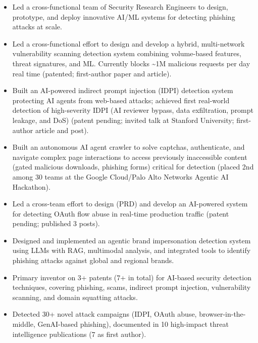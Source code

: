 \documentclass[letterpaper,11pt]{article}
\begin{document}
      \begin{itemize}[leftmargin=0.2in, label={$\bullet$}, topsep=0pt]
        \item \small Led a cross-functional team of Security Research Engineers to design, prototype, and deploy innovative AI/ML systems for detecting phishing attacks at scale.
        \item \small Led a cross-functional effort to design and develop a hybrid, multi-network vulnerability scanning detection system combining volume-based features, threat signatures, and ML. Currently blocks \textasciitilde1M malicious requests per day real time (patented; first-author paper and article).
        \item \small Built an AI-powered indirect prompt injection (IDPI) detection system protecting AI agents from web-based attacks; achieved first real-world detection of high-severity IDPI (AI reviewer bypass, data exfiltration, prompt leakage, and DoS) (patent pending; invited talk at Stanford University; first-author article and post).
        \item \small Built an autonomous AI agent crawler to solve captchas, authenticate, and navigate complex page interactions to access previously inaccessible content (gated malicious downloads, phishing forms) critical for detection (placed 2nd among 30 teams at the Google Cloud/Palo Alto Networks Agentic AI Hackathon).
        \item \small Led a cross-team effort to design (PRD) and develop an AI-powered system for detecting OAuth flow abuse in real-time production traffic (patent pending; published 3 posts).
        \item \small Designed and implemented an agentic brand impersonation detection system using LLMs with RAG, multimodal analysis, and integrated tools to identify phishing attacks against global and regional brands.
        \item \small Primary inventor on 3+ patents (7+ in total) for AI-based security detection techniques, covering phishing, scams, indirect prompt injection, vulnerability scanning, and domain squatting attacks.
        \item \small Detected 30+ novel attack campaigns (IDPI, OAuth abuse, browser-in-the-middle, GenAI-based phishing), documented in 10 high-impact threat intelligence publications (7 as first author).
      \end{itemize}
\end{document}
